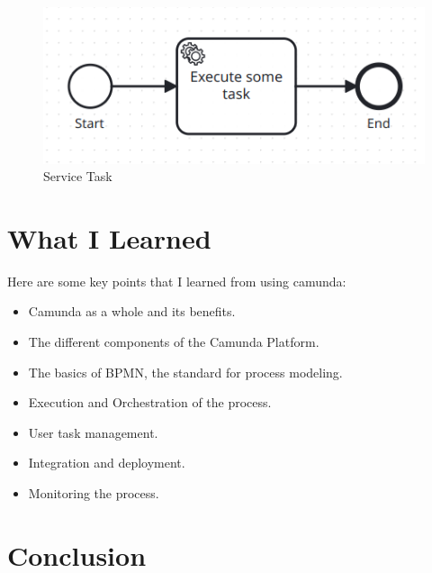 \documentclass[12pt]{article}
\begin{document}
{\begin{figure}[h]
    \centering
    \includegraphics[width=.37\linewidth]{service_task.png}
    \caption{Service Task}
    \label{fig:service_task}
\end{figure}

\pagebreak

\section{What I Learned}

Here are some key points that I learned from using camunda:

\begin{itemize}
  \item Camunda as a whole and its benefits.
  \item The different components of the Camunda Platform.
  \item The basics of BPMN, the standard for process modeling.
  \item Execution and Orchestration of the process.
  \item User task management.
  \item Integration and deployment.
  \item Monitoring the process.
\end{itemize}

\pagebreak

\section{Conclusion}

}

\printbibliography
\end{document}
